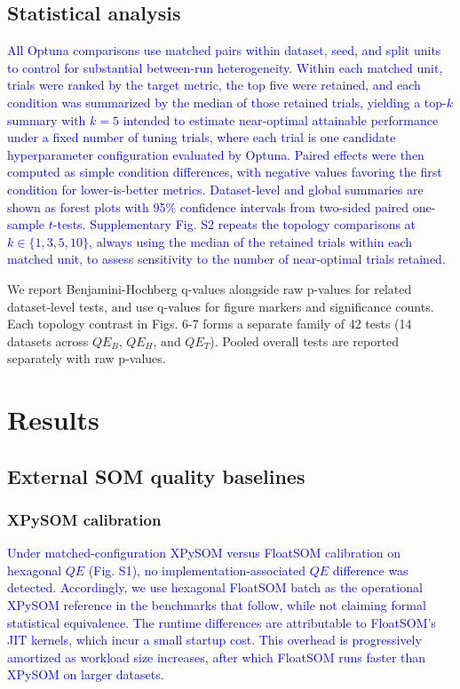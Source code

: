 \documentclass[10pt]{article} %
\newcommand{\TrackedChange}[1]{\textcolor{blue}{#1}}
\begin{document}
\subsection{Statistical analysis}

\TrackedChange{All Optuna comparisons use matched pairs within dataset, seed, and split units to control for substantial between-run heterogeneity. Within each matched unit, trials were ranked by the target metric, the top five were retained, and each condition was summarized by the median of those retained trials, yielding a top-$k$ summary with $k=5$ intended to estimate near-optimal attainable performance under a fixed number of tuning trials, where each trial is one candidate hyperparameter configuration evaluated by Optuna. Paired effects were then computed as simple condition differences, with negative values favoring the first condition for lower-is-better metrics. Dataset-level and global summaries are shown as forest plots with 95\% confidence intervals from two-sided paired one-sample $t$-tests. Supplementary Fig. S2 repeats the topology comparisons at $k\in\{1,3,5,10\}$, always using the median of the retained trials within each matched unit, to assess sensitivity to the number of near-optimal trials retained.}

We report Benjamini-Hochberg q-values alongside raw p-values for related dataset-level tests, and use q-values for figure markers and significance counts. Each topology contrast in Figs. 6-7 forms a separate family of 42 tests (14 datasets across $QE_B$, $QE_H$, and $QE_T$). Pooled overall tests are reported separately with raw p-values.

\section{Results}

\subsection{External SOM quality baselines}

\subsubsection{XPySOM calibration}

\TrackedChange{Under matched-configuration XPySOM versus FloatSOM calibration on hexagonal $QE$ (Fig. S1), no implementation-associated $QE$ difference was detected. Accordingly, we use hexagonal FloatSOM batch as the operational XPySOM reference in the benchmarks that follow, while not claiming formal statistical equivalence. The runtime differences are attributable to FloatSOM's JIT kernels, which incur a small startup cost. This overhead is progressively amortized as workload size increases, after which FloatSOM runs faster than XPySOM on larger datasets.}
\end{document}
